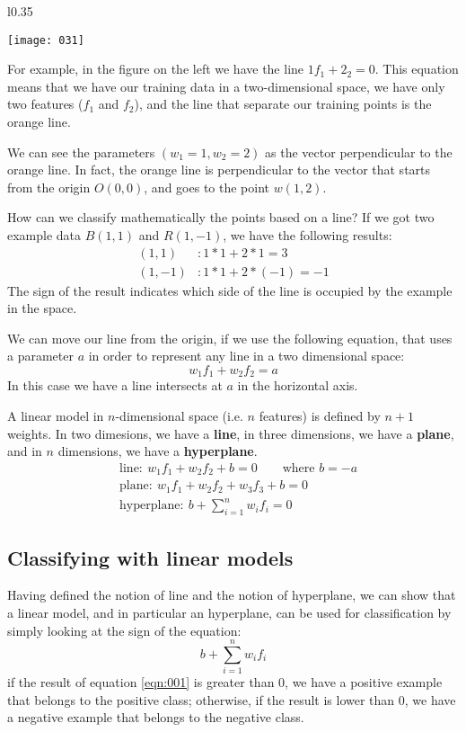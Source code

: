 \begin{example}
\begin{wrapfigure}{l}{0.35\textwidth}
\begin{center}
    \texttt{[image: 031]}
    \label{fig:031}
\end{center}
\end{wrapfigure}
For example, in the figure on the left we have the line \(1f_1+2_2 = 0\). This equation means that we have our training data in a two-dimensional space, we have only two features (\(f_1\) and \(f_2\)), and the line that separate our training points is the orange line.

We can see the parameters \((w_1=1,w_2=2)\) as the vector perpendicular to the orange line. In fact, the orange line is perpendicular to the vector that starts from the origin \(O(0,0)\), and goes to the point \(w(1,2)\).

How can we classify mathematically the points based on a line? If we got two example data \(B(1,1)\) and \(R(1,-1)\), we have the following results:
\begin{align*}
(1,1) &: 1*1+2*1=3\\
(1,-1) &: 1*1+2*(-1)=-1
\end{align*}
The sign of the result indicates which side of the line is occupied by the example in the space.

\end{example}

We can move our line from the origin, if we use the following equation, that uses a parameter \(a\) in order to represent any line in a two dimensional space:
\[w_1f_1+w_2f_2=a\]
In this case we have a line intersects at \(a\) in the horizontal axis.

A linear model in \(n\)-dimensional space (i.e. \(n\) features) is defined by \(n+1\) weights. In two dimesions, we have a \textbf{line}, in three dimensions, we have a \textbf{plane}, and in \(n\) dimensions, we have a \textbf{hyperplane}.
\begin{align}
    &\text{line}:\ w_1f_1+w_2f_2+b=0 \qquad \text{where } b=-a\\
    &\text{plane}:\ w_1f_1+w_2f_2+w_3f_3+b=0\\
    &\text{hyperplane}:\ b+\sum_{i=1}^nw_if_i=0
\end{align}

\subsection{Classifying with linear models}
Having defined the notion of line and the notion of hyperplane, we can show that a linear model, and in particular an hyperplane, can be used for classification by simply looking at the sign of the equation:
\begin{equation*}
\label{eqn:001}
b+\sum_{i=1}^nw_if_i
\end{equation*}
if the result of equation \ref{eqn:001} is greater than \(0\), we have a positive example that belongs to the positive class; otherwise, if the result is lower than \(0\), we have a negative example that belongs to the negative class.

